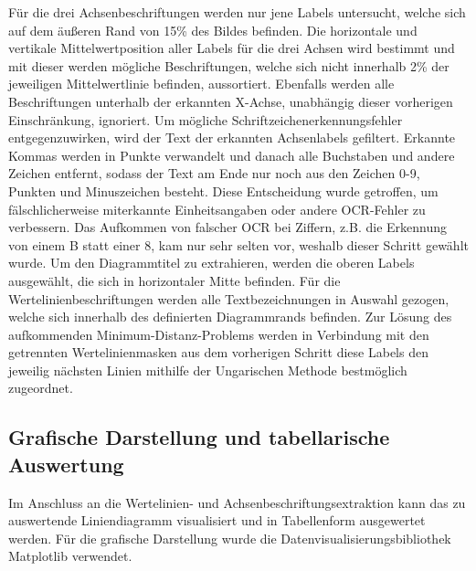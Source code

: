 Für die drei Achsenbeschriftungen werden nur jene Labels untersucht, welche sich auf dem äußeren Rand von 15\% des Bildes befinden. Die horizontale und vertikale Mittelwertposition aller Labels für die drei Achsen wird bestimmt und mit dieser werden mögliche Beschriftungen, welche sich nicht innerhalb 2\% der jeweiligen Mittelwertlinie befinden, aussortiert. Ebenfalls werden alle Beschriftungen unterhalb der erkannten X-Achse, unabhängig dieser vorherigen Einschränkung, ignoriert. Um mögliche Schriftzeichenerkennungsfehler entgegenzuwirken, wird der Text der erkannten Achsenlabels gefiltert. Erkannte Kommas werden in Punkte verwandelt und danach alle Buchstaben und andere Zeichen entfernt, sodass der Text am Ende nur noch aus den Zeichen 0-9, Punkten und Minuszeichen besteht. Diese Entscheidung wurde getroffen, um fälschlicherweise miterkannte Einheitsangaben oder andere OCR-Fehler zu verbessern. Das Aufkommen von falscher OCR bei Ziffern, z.B. die Erkennung von einem B statt einer 8, kam nur sehr selten vor, weshalb dieser Schritt gewählt wurde.
Um den Diagrammtitel zu extrahieren, werden die oberen Labels ausgewählt, die sich in horizontaler Mitte befinden. Für die Wertelinienbeschriftungen werden alle Textbezeichnungen in Auswahl gezogen, welche sich innerhalb des definierten Diagrammrands befinden. Zur Lösung des aufkommenden Minimum-Distanz-Problems werden in Verbindung mit den getrennten Wertelinienmasken aus dem vorherigen Schritt diese Labels den jeweilig nächsten Linien mithilfe der Ungarischen Methode bestmöglich zugeordnet.
\clearpage
\subsection{Grafische Darstellung und tabellarische Auswertung}

Im Anschluss an die Wertelinien- und Achsenbeschriftungsextraktion kann das zu auswertende Liniendiagramm visualisiert und in Tabellenform ausgewertet werden. Für die grafische Darstellung wurde die Datenvisualisierungsbibliothek Matplotlib \cite{Hunter:2007} verwendet.

